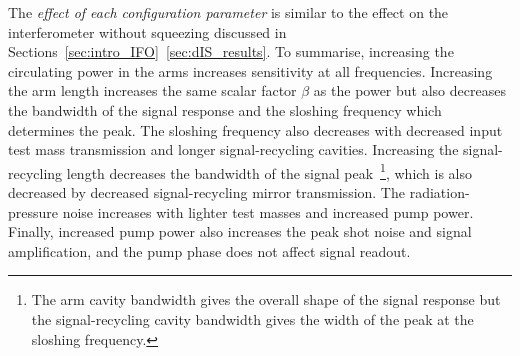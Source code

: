 The \emph{effect of each configuration parameter} is similar to the effect on the interferometer without squeezing discussed in Sections~\ref{sec:intro_IFO}~\ref{sec:dIS_results}. To summarise, increasing the circulating power in the arms increases sensitivity at all frequencies. Increasing the arm length increases the same scalar factor $\beta$ as the power but also decreases the bandwidth of the signal response and the sloshing frequency which determines the peak. The sloshing frequency also decreases with decreased input test mass transmission and longer signal-recycling cavities. Increasing the signal-recycling length decreases the bandwidth of the signal peak~\footnote{The arm cavity bandwidth gives the overall shape of the signal response but the signal-recycling cavity bandwidth gives the width of the peak at the sloshing frequency.}, which is also decreased by decreased signal-recycling mirror transmission. The radiation-pressure noise increases with lighter test masses and increased pump power. Finally, increased pump power also increases the peak shot noise and signal amplification, and the pump phase does not affect signal readout.


\label{sec:nOPO_reduction}


